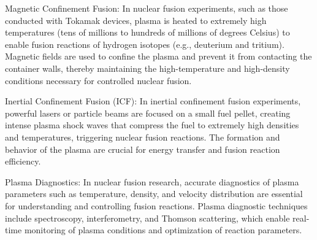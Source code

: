 \begin{itemize}
	Magnetic Confinement Fusion: In nuclear fusion experiments, such as those conducted with Tokamak devices, plasma is heated to extremely high temperatures (tens of millions to hundreds of millions of degrees Celsius) to enable fusion reactions of hydrogen isotopes (e.g., deuterium and tritium). Magnetic fields are used to confine the plasma and prevent it from contacting the container walls, thereby maintaining the high-temperature and high-density conditions necessary for controlled nuclear fusion.
	
	Inertial Confinement Fusion (ICF): In inertial confinement fusion experiments, powerful lasers or particle beams are focused on a small fuel pellet, creating intense plasma shock waves that compress the fuel to extremely high densities and temperatures, triggering nuclear fusion reactions. The formation and behavior of the plasma are crucial for energy transfer and fusion reaction efficiency.
	
	Plasma Diagnostics: In nuclear fusion research, accurate diagnostics of plasma parameters such as temperature, density, and velocity distribution are essential for understanding and controlling fusion reactions. Plasma diagnostic techniques include spectroscopy, interferometry, and Thomson scattering, which enable real-time monitoring of plasma conditions and optimization of reaction parameters.
\end{itemize}